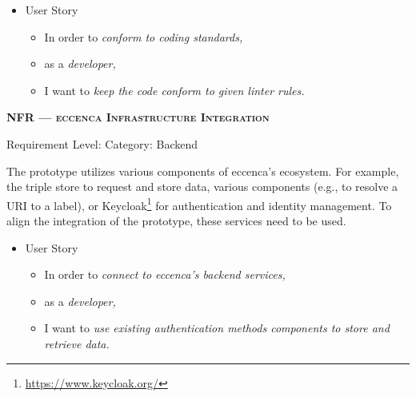 

\begin{itemize}[after=\vspace{1em}]
    \setlength\itemsep{-0.5em}
	\item[] User Story\\[-7.8mm]
	\begin{itemize}
    \setlength\itemsep{-0.5em}
        \item[] In order to \textit{conform to coding standards,}
        \item[] as a \textit{developer,}
        \item[] I want to \textit{keep the code conform to given linter rules.}
    \end{itemize}
\end{itemize}



\centerline{\textbf{NFR\textsubscript{} --- \textsc{eccenca Infrastructure Integration}}}
\centerline{\small Requirement Level:  \quad{} Category: Backend}

\noindent The prototype utilizes various components of eccenca’s ecosystem. For example, the triple store to request and store data, various  components (e.g., to resolve a \acrshort*{URI} to a label), or Keycloak\footnote{\url{https://www.keycloak.org/}} for authentication and identity management. To align the integration of the prototype, these services need to be used.

\begin{itemize}[after=\vspace{1em}]
    \setlength\itemsep{-0.5em}
	\item[] User Story\\[-7.8mm]
	\begin{itemize}
    \setlength\itemsep{-0.5em}
        \item[] In order to \textit{connect to eccenca’s backend services,}
        \item[] as a \textit{developer,}
        \item[] I want to \textit{use existing authentication methods  components to store and retrieve data.}
    \end{itemize}
\end{itemize}









